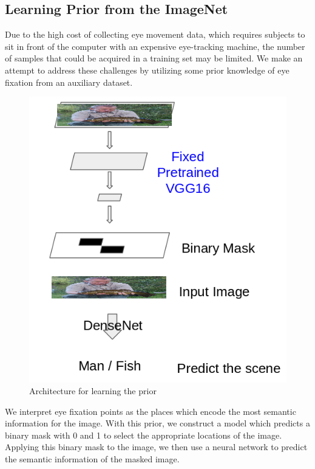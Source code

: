 \documentclass[10pt,twocolumn,letterpaper]{article}
\begin{document}
\subsection{Learning Prior from the ImageNet}

 Due to the high cost of collecting eye movement data, which requires subjects
 to sit in front of the computer with an expensive eye-tracking machine, the
 number of samples that could be acquired in a training set may be limited. We
 make an attempt to address these challenges by utilizing some prior knowledge
 of eye fixation from an auxiliary dataset.
 
 \begin{figure}
 	\begin{center}
 		\includegraphics[width=\columnwidth]{figures/Prior.png}
 		
 	\end{center}
 	\caption{Architecture for learning the prior}
 	\label{fig:prior}
 \end{figure}
 
 We interpret eye fixation points as the places which encode the most semantic
 information for the image. With this prior, we construct a model which
 predicts a binary mask with 0 and 1 to select the appropriate locations of the
 image. Applying this binary mask to the image, we then use a neural network to
 predict the semantic information of the masked image. 
 
\end{document}
